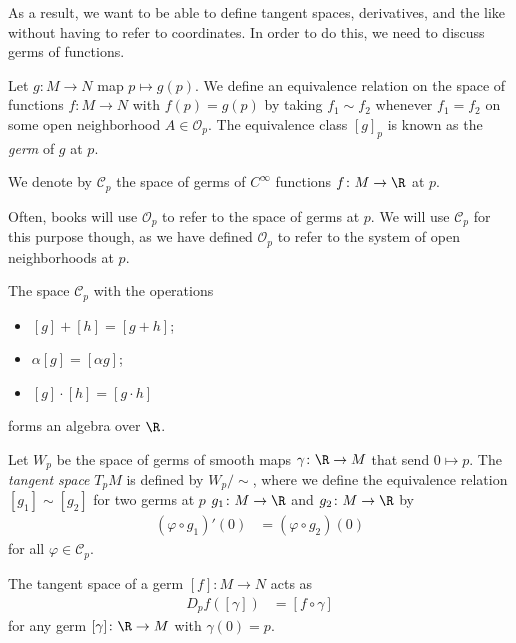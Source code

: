 \documentclass[10pt]{mypackage}
\begin{document}
As a result, we want to be able to define tangent spaces, derivatives, and the like without having to refer to coordinates. In order to do this, we need to discuss germs of functions.
\begin{definition}
  Let $g\colon M\rightarrow N$ map $p\mapsto g(p)$. We define an equivalence relation on the space of functions $f\colon M\rightarrow N$ with $f(p) = g(p)$ by taking $f_1\sim f_2$ whenever $f_1 = f_2$ on some open neighborhood $A\in \mathcal{O}_p$. The equivalence class $\left[ g \right]_p$ is known as the \textit{germ} of $g$ at $p$.\newline

  We denote by $\mathcal{C}_{p}$ the space of germs of $C^{\infty}$ functions $f\colon M\rightarrow \R$ at $p$.
\end{definition}
\begin{remark}
  Often, books will use $\mathcal{O}_p$ to refer to the space of germs at $p$. We will use $\mathcal{C}_p$ for this purpose though, as we have defined $\mathcal{O}_p$ to refer to the system of open neighborhoods at $p$.
\end{remark}
\begin{proposition}
  The space $\mathcal{C}_{p}$ with the operations
  \begin{itemize}
    \item $\left[ g \right] + \left[ h \right] = \left[ g + h \right]$;
    \item $\alpha \left[ g \right] = \left[ \alpha g \right]$;
    \item $\left[ g \right]\cdot \left[ h \right] = \left[ g\cdot h \right]$
  \end{itemize}
  forms an algebra over $\R$.
\end{proposition}
\begin{definition}
  Let $W_p$ be the space of germs of smooth maps $\gamma\colon \R\rightarrow M$ that send $0 \mapsto p$. The \textit{tangent space} $T_pM$ is defined by $W_p/\sim$, where we define the equivalence relation $\left[ g_1 \right]\sim \left[ g_2 \right]$ for two germs at $p$  $g_1\colon M\rightarrow \R$ and $g_2\colon M\rightarrow \R$ by
  \begin{align*}
    \left( \varphi\circ g_1 \right)'(0) &= \left( \varphi\circ g_2 \right)(0)
  \end{align*}
  for all $\varphi\in \mathcal{C}_p$.
\end{definition}
\begin{definition}
  The tangent space of a germ $[f]\colon M\rightarrow N$ acts as
  \begin{align*}
    D_pf\left( [\gamma] \right) &= \left[ f\circ\gamma \right]
  \end{align*}
  for any germ $[\gamma]\colon \R\rightarrow M$ with $\gamma(0) = p$.
\end{definition}
\end{document}
